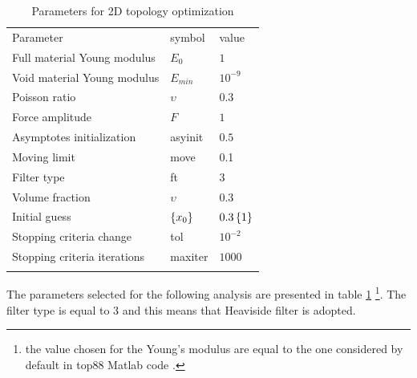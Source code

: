\begin{table}[h!]
                        \caption{Parameters for 2D topology optimization }
                        \label{tab:2.1}       %
                        \centering
                        \begin{tabular}{lll}
                        \hline\noalign{\smallskip}
                        Parameter & symbol & value\\
                        \noalign{\smallskip}\hline\noalign{\smallskip}
           
                        Full material Young modulus & $E_0$ & $1$\\
                        Void material Young modulus & $E_{min}$ & $10^{-9}$ \\
                        Poisson ratio & $\upsilon$ & $0.3$\\
                        Force amplitude & $F$ & $1$\\
                        Asymptotes initialization & asyinit & $0.5$\\
                        Moving limit & move & 0.1\\
                        Filter type & ft & 3\\
                        Volume fraction & $\upsilon$ & 0.3\\
                        Initial guess & $\left\lbrace{x_0}\right \rbrace$ & $0.3\left\lbrace{1}\right \rbrace$
                       \\ Stopping criteria change & tol & $10^{-2}$\\
                        Stopping criteria iterations & maxiter& $1000$\\
                        \noalign{\smallskip}\hline
                        \end{tabular}
                        \end{table} 
The parameters selected for the following analysis are presented in table \ref{tab:2.1} \footnote{the value chosen for the Young's modulus are equal to the one considered by default in top88 Matlab code \cite{andreassen2011efficient}.}. The filter type is equal to 3 and this means that Heaviside filter is adopted.
\newpage
